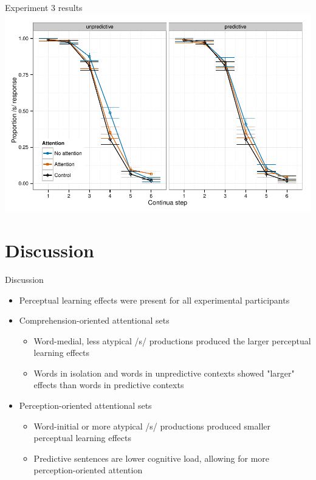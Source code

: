 \documentclass{beamer}
\begin{document}
\begin{frame}{Experiment 3 results}
\includegraphics[width=\textwidth]{graphs/exp3_categresults_present.pdf}
\end{frame}

\section{Discussion}

\begin{frame}{Discussion}
\begin{itemize}
\item Perceptual learning effects were present for all experimental participants
\item Comprehension-oriented attentional sets
\begin{itemize}
\item Word-medial, less atypical /s/ productions produced the larger perceptual learning effects
\item Words in isolation and words in unpredictive contexts showed "larger" effects than words in predictive contexts
\end{itemize}
\item Perception-oriented attentional sets
\begin{itemize}
\item Word-initial or more atypical /s/ productions produced smaller perceptual learning effects
\item Predictive sentences are lower cognitive load, allowing for more perception-oriented attention \citep{Samuel1981}
\end{itemize}
\end{itemize}
\end{frame}
\end{document}
